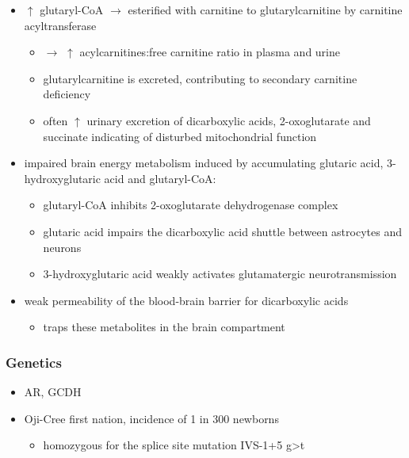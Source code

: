 \documentclass{scrartcl}
\begin{document}
\begin{itemize}
\item \(\uparrow\) glutaryl-CoA \(\to\) esterified with carnitine to
glutarylcarnitine by carnitine acyltransferase
\begin{itemize}
\item \(\to\) \(\uparrow\) acylcarnitines:free carnitine ratio in plasma and
urine
\item glutarylcarnitine is excreted, contributing to secondary carnitine
deficiency
\item often \(\uparrow\) urinary excretion of dicarboxylic acids,
2-oxoglutarate and succinate indicating of disturbed mitochondrial
function
\end{itemize}

\item impaired brain energy metabolism induced by accumulating glutaric
acid, 3-hydroxyglutaric acid and glutaryl-CoA:
\begin{itemize}
\item glutaryl-CoA inhibits 2-oxoglutarate dehydrogenase complex
\item glutaric acid impairs the dicarboxylic acid shuttle between
astrocytes and neurons
\item 3-hydroxyglutaric acid weakly activates glutamatergic neurotransmission
\end{itemize}

\item weak permeability of the blood-brain barrier for dicarboxylic acids
\begin{itemize}
\item traps these metabolites in the brain compartment
\end{itemize}
\end{itemize}

\subsubsection{Genetics}
\label{sec:orgd5dc610}
\begin{itemize}
\item AR, GCDH
\item Oji-Cree first nation, incidence of 1 in 300 newborns
\begin{itemize}
\item homozygous for the splice site mutation IVS-1+5 g>t
\end{itemize}
\end{itemize}
\end{document}
